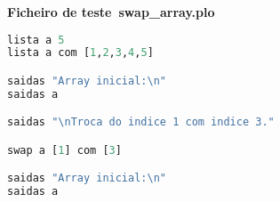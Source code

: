 \documentclass[11pt,a4paper]{report}%
\begin{document}
\textbf{Ficheiro de teste\ swap\_array.plo}
\begin{scriptsize}
\begin{lstlisting}[language=python]
lista a 5
lista a com [1,2,3,4,5]

saidas "Array inicial:\n"
saidas a

saidas "\nTroca do indice 1 com indice 3."

swap a [1] com [3]

saidas "Array inicial:\n"
saidas a
\end{lstlisting}
\end{scriptsize}
\end{document}
